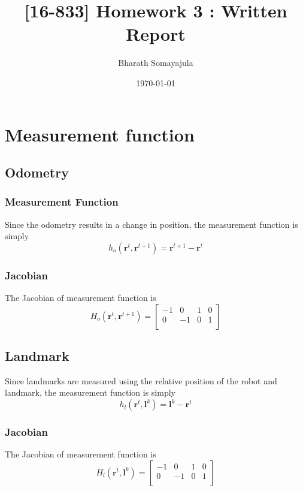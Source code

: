 \documentclass[12pt, a4paper]{article}
\title{[16-833] Homework 3 : Written Report}
\author{Bharath Somayajula}
\date{\today}
\begin{document}
\maketitle

\tableofcontents
\section{Measurement function}
\subsection{Odometry}
\subsubsection{Measurement Function}
Since the odometry results in a change in position, the measurement function is simply
\[h_o(\mathbf{r}^t, \mathbf{r}^{t+1}) = \mathbf{r}^{t+1} - \mathbf{r}^t\]
\subsubsection{Jacobian}
The Jacobian of measurement function is
\[H_o(\mathbf{r}^t, \mathbf{r}^{t+1}) = \begin{bmatrix}
  -1 & 0 & 1 & 0\\
  0 & -1 & 0 & 1\\
\end{bmatrix}\]
\subsection{Landmark}
Since landmarks are measured using the relative position of the robot and landmark, the measurement function is simply
\[h_l(\mathbf{r}^t, \mathbf{l}^{k}) = \mathbf{l}^{k} - \mathbf{r}^t\]
\subsubsection{Jacobian}
The Jacobian of measurement function is
\[H_l(\mathbf{r}^t, \mathbf{l}^{k}) = \begin{bmatrix}
  -1 & 0 & 1 & 0\\
  0 & -1 & 0 & 1\\
\end{bmatrix}\]
\end{document}
